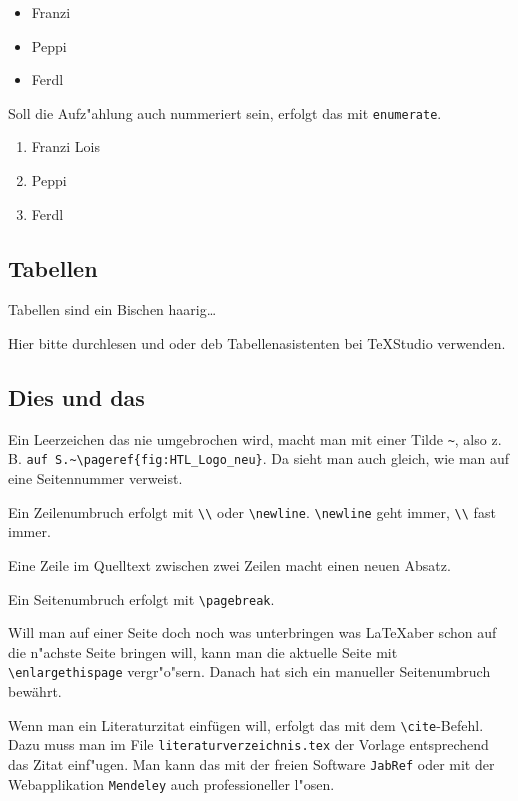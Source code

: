 		\begin{itemize}
			\item Franzi
			\item[\smiley] Peppi
			\item[\frownie] Ferdl
		\end{itemize}





		 Soll die Aufz"ahlung auch nummeriert sein, erfolgt das mit \verb|enumerate|.

		\begin{enumerate}
			\item Franzi  \newline
			      Lois
			\item Peppi
			\item Ferdl
		\end{enumerate}

		\pagebreak
		\subsection{Tabellen}
		Tabellen sind ein Bischen haarig\dots

		Hier bitte \cite{l2kurz} durchlesen und oder deb Tabellenasistenten bei \TeX Studio verwenden.


		\subsection{Dies und das}
		Ein Leerzeichen das nie umgebrochen wird, macht man mit einer Tilde \verb|~|, also z.\,B. \verb|auf S.~\pageref{fig:HTL_Logo_neu}|. Da sieht man auch gleich, wie man auf eine Seitennummer verweist.

		Ein Zeilenumbruch erfolgt mit \verb|\\| oder \verb|\newline|. \verb|\newline| geht immer, \verb|\\| fast immer.

		Eine Zeile im Quelltext zwischen zwei Zeilen macht einen neuen Absatz.

		Ein Seitenumbruch erfolgt mit \verb|\pagebreak|.

		Will man auf einer Seite doch noch was unterbringen was \LaTeX aber schon auf die n"achste Seite bringen will, kann man die aktuelle Seite  mit \verb|\enlargethispage| vergr"o"sern. Danach hat sich ein manueller Seitenumbruch bew\"ahrt.

		Wenn man ein Literaturzitat einfügen will, erfolgt das mit dem \verb|\cite|-Befehl.	Dazu muss man im  File \verb|literaturverzeichnis.tex| der Vorlage entsprechend das Zitat einf"ugen. Man kann das mit der freien Software \verb|JabRef| oder mit der Webapplikation \verb|Mendeley| auch professioneller l"osen.



